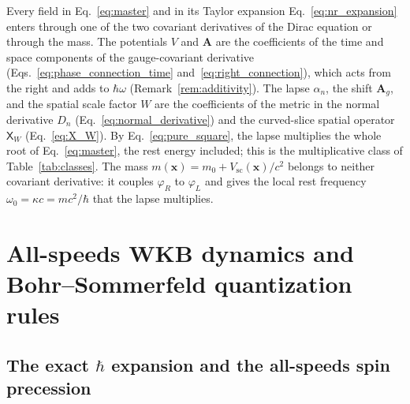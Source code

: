 \documentclass[aps,prd,onecolumn,tightenlines,nofootinbib,notitlepage,11pt,floatfix]{revtex4-2}
\theoremstyle{indentedtheorem}
\begin{document}
Every field in Eq.~\eqref{eq:master} and in its Taylor expansion Eq.~\eqref{eq:nr_expansion} enters through one of the two covariant derivatives of the Dirac equation or through the mass. The potentials $V$ and $\mathbf{A}$ are the coefficients of the time and space components of the gauge-covariant derivative (Eqs.~\eqref{eq:phase_connection_time} and~\eqref{eq:right_connection}), which acts from the right and adds to $\hbar\omega$ (Remark~\ref{rem:additivity}). The lapse $\alpha_n$, the shift $\mathbf{A}_g$, and the spatial scale factor $W$ are the coefficients of the metric in the normal derivative $D_n$ (Eq.~\eqref{eq:normal_derivative}) and the curved-slice spatial operator $\mathsf{X}_W$ (Eq.~\eqref{eq:X_W}). By Eq.~\eqref{eq:pure_square}, the lapse multiplies the whole root of Eq.~\eqref{eq:master}, the rest energy included; this is the multiplicative class of Table~\ref{tab:classes}. The mass $m(\mathbf{x})=m_0+V_\text{sc}(\mathbf{x})/c^2$ belongs to neither covariant derivative: it couples $\varphi_R$ to $\varphi_L$ and gives the local rest frequency $\omega_0=\kappa c=mc^2/\hbar$ that the lapse multiplies.

\section{All-speeds WKB dynamics and Bohr--Sommerfeld quantization rules}
\label{sec:levels}

\subsection{The exact \texorpdfstring{$\hbar$}{hbar} expansion and the all-speeds spin precession}
\label{sec:wkb_all_speeds}
\end{document}
